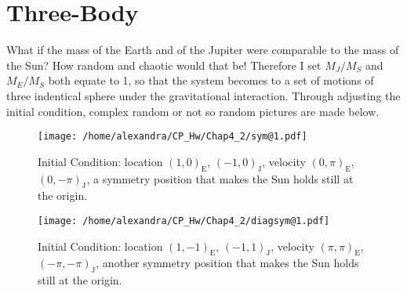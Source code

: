 \documentclass[11pt,twoside,a4paper]{article}
\begin{document}
\section{Three-Body}
What if the mass of the Earth and of the Jupiter were comparable to the mass of the Sun? How random and chaotic would that be! Therefore I set $M_J/M_S$ and $M_E/M_S$ both equate to 1, so that the system becomes to a set of motions of three indentical sphere under the gravitational interaction. Through adjusting the initial condition, complex random or not so random pictures are made below.
\begin{figure}[htbp]
\centering
\texttt{[image: /home/alexandra/CP\_Hw/Chap4\_2/sym@1.pdf]}
\caption{Initial Condition: location $(1,0)_\mathrm{E}$, $(-1,0)_\mathrm{J}$,    velocity $(0,\pi)_\mathrm{E}$, $(0,-\pi)_\mathrm{J}$, a symmetry position that makes the Sun holds still at the origin.}
\end{figure}
\begin{figure}[htbp]
\centering
\texttt{[image: /home/alexandra/CP\_Hw/Chap4\_2/diagsym@1.pdf]}
\caption{Initial Condition: location $(1,-1)_\mathrm{E}$, $(-1,1)_\mathrm{J}$,    velocity $(\pi,\pi)_\mathrm{E}$, $(-\pi,-\pi)_\mathrm{J}$, another symmetry position that makes the Sun holds still at the origin.}
\end{figure}
\end{document}
